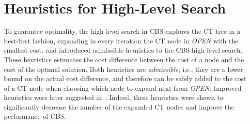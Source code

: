 \documentclass[letterpaper]{article} %
\newcommand\konstantin[1]{\nb{\textbf{Konstantin:}}{red}{#1}}
\newcommand{\cbs}{\ac{CBS}\xspace}
\newcommand{\cbsh}{{CBS-H}\xspace}
\newcommand{\ct}{\ac{CT}\xspace}
\newcommand{\soc}{\ac{SOC}\xspace}
\newcommand{\astar}{A$^*$\xspace}
\newcommand{\mapf}{\ac{MAPF}\xspace}
\newcommand{\open}{\textit{OPEN}\xspace}
\begin{document}


\section{Heuristics for High-Level Search}




To guarantee optimality, the high-level search in \cbs explores the \ct tree in a best-first fashion, expanding in every iteration the \ct node in \open with the smallest cost. %
\citet{CBSH} and \citet{CBSH2} introduced admissible heuristics to the \cbs high-level search. 
These heuristics estimates the cost difference between the cost of a node and the cost of the optimal solution. Both heuristics are \emph{admissible}, i.e., they are a lower bound on the actual cost difference, and therefore can be safely added to the cost of a \ct node when choosing which node to expand next from \open. 
Improved heuristics were later suggested in~\cite{CBSH2}. 
Indeed, these heuristics were shown to significantly decrease the number of the expanded \ct nodes and improve the performance of \cbs. 
\end{document}
